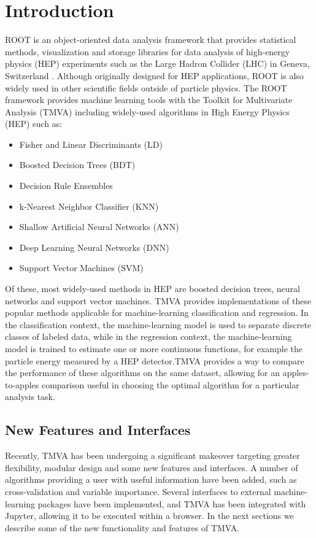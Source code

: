 \documentclass[a4paper]{jpconf}
\begin{document}
\section{Introduction}
ROOT is an object-oriented data analysis framework that provides statistical methods, visualization and storage libraries for data analysis of high-energy physics (HEP) experiments such as the Large Hadron Collider (LHC) in Geneva, Switzerland \cite{Antcheva20092499}. Although originally designed for HEP applications, ROOT is also widely used in other scientific fields outside of particle physics.\newline\newline 
The ROOT framework provides machine learning tools with the Toolkit for Multivariate Analysis (TMVA) \cite{Hocker:2007ht} including widely-used algorithms in High Energy Physics (HEP) such as:
\begin{itemize}  
\item Fisher and Linear Discriminants (LD)
\item Boosted Decision Trees (BDT)
\item Decision Rule Ensembles
\item k-Nearest Neighbor Classifier (KNN)
\item Shallow Artificial Neural Networks (ANN)
\item Deep Learning Neural Networks (DNN)
\item Support Vector Machines (SVM)
\end{itemize}
Of these, most widely-used methods in HEP are boosted decision trees, neural networks and support vector machines. TMVA provides implementations of these popular methods applicable for machine-learning classification and regression. In the classification context, the machine-learning model is used to separate discrete classes of labeled data, while in the regression context, the machine-learning model is trained to estimate one or more continuous functions, for example the particle energy measured by a HEP detector.TMVA provides a way to compare the performance of these algorithms on the same dataset, allowing for an apples-to-apples comparison useful in choosing the optimal algorithm for a particular analysis task.

\subsection{New Features and Interfaces}
Recently, TMVA has  been undergoing a significant makeover targeting greater flexibility, modular design and some new features and interfaces. A number of algorithms providing a user with useful information have been added, such as cross-validation and variable importance. Several interfaces to external machine-learning packages have been implemented, and TMVA has been integrated with Jupyter, allowing it to be executed within a browser. In the next sections we describe some of the new functionality and features of TMVA.
\end{document}
